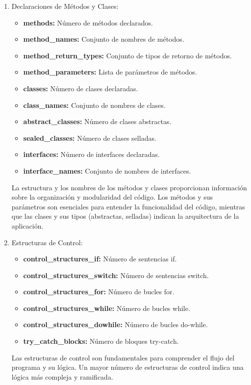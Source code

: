 \begin{enumerate}
    \item Declaraciones de Métodos y Clases:
    \begin{itemize}
        \item {\bf methods:} Número de métodos declarados.
        \item {\bf method\_names:} Conjunto de nombres de métodos.
        \item {\bf method\_return\_types:} Conjunto de tipos de retorno de métodos.
        \item {\bf method\_parameters:} Lista de parámetros de métodos.
        \item {\bf classes:} Número de clases declaradas.
        \item {\bf class\_names:} Conjunto de nombres de clases.
        \item {\bf abstract\_classes:} Número de clases abstractas.
        \item {\bf sealed\_classes:} Número de clases selladas.
        \item {\bf interfaces:} Número de interfaces declaradas.
        \item {\bf interface\_names:} Conjunto de nombres de interfaces.
    \end{itemize}
    La estructura y los nombres de los métodos y clases proporcionan información sobre la organización y modularidad del código. Los métodos y sus parámetros son esenciales para entender la funcionalidad del código, mientras que las clases y sus tipos (abstractas, selladas) indican la arquitectura de la aplicación.

    \item Estructuras de Control:
    \begin{itemize}
        \item {\bf control\_structures\_if:} Número de sentencias if.
        \item {\bf control\_structures\_switch:} Número de sentencias switch.
        \item {\bf control\_structures\_for:} Número de bucles for.
        \item {\bf control\_structures\_while:} Número de bucles while.
        \item {\bf control\_structures\_dowhile:} Número de bucles do-while.
        \item {\bf try\_catch\_blocks:} Número de bloques try-catch.
    \end{itemize}
    Las estructuras de control son fundamentales para comprender el flujo del programa y su lógica. Un mayor número de estructuras de control indica una lógica más compleja y ramificada.


\end{enumerate}
